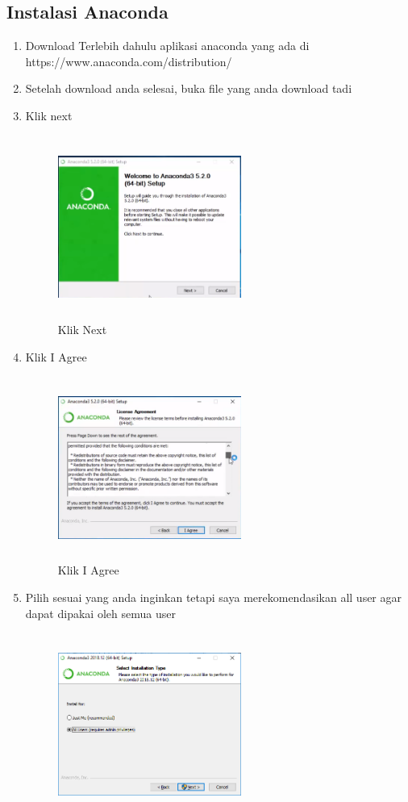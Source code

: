 \subsection{Instalasi Anaconda}
\begin{enumerate}
\item Download Terlebih dahulu aplikasi anaconda yang ada di https://www.anaconda.com/distribution/ 
\item Setelah download anda selesai, buka file yang anda download tadi
\item Klik next
\begin{figure}[H]
\centering
\includegraphics[width=6cm,height=6cm]{figures/gambar1.png}
\caption{Klik Next}
\label{akhir}
\end{figure}
\item Klik I Agree
\begin{figure}[H]
\centering
\includegraphics[width=6cm,height=6cm]{figures/gambar2.png}
\caption{Klik I Agree}
\label{akhir}
\end{figure}
\item Pilih sesuai yang anda inginkan tetapi saya merekomendasikan all user agar dapat dipakai oleh semua user
\begin{figure}[H]
\centering
\includegraphics[width=6cm,height=6cm]{figures/gambar3.png}

\end{figure}
\end{enumerate}

